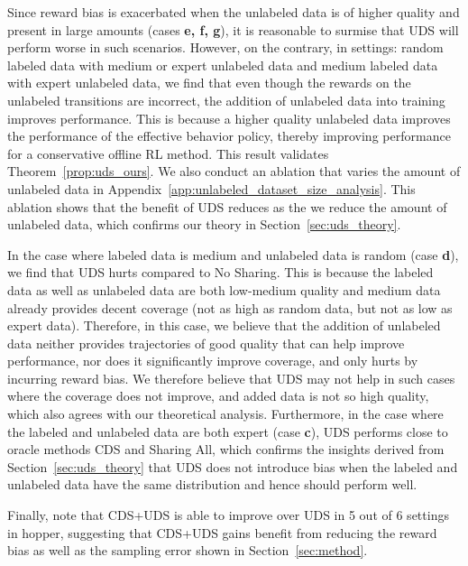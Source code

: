 Since reward bias is exacerbated when the unlabeled data is of higher quality and present in large amounts (cases \textbf{e, f, g}), it is reasonable to surmise that UDS will perform worse in such scenarios. However, on the contrary, in settings: random labeled data with medium or expert unlabeled data and medium labeled data with expert unlabeled data, we find that even though the rewards on the unlabeled transitions are incorrect, the addition of unlabeled data into training improves performance. This is because a higher quality unlabeled data improves the performance of the effective behavior policy, thereby improving performance for a conservative offline RL method. This result validates Theorem~\ref{prop:uds_ours}. 
We also conduct an ablation that varies the amount of unlabeled data in Appendix~\ref{app:unlabeled_dataset_size_analysis}. This ablation shows that the benefit of UDS reduces as the we reduce the amount of unlabeled data, which confirms our theory in Section~\ref{sec:uds_theory}.

In the case where labeled data is medium and unlabeled data is random (case \textbf{d}), we find that UDS hurts compared to No Sharing. This is because the labeled data as well as unlabeled data are both low-medium quality and medium data already provides decent coverage (not as high as random data, but not as low as expert data). Therefore, in this case, we believe that the addition of unlabeled data neither provides trajectories of good quality that can help improve performance, nor does it significantly improve coverage, and only hurts by incurring reward bias. We therefore believe that UDS may not help in such cases where the coverage does not improve, and added data is not so high quality, which also agrees with our theoretical analysis. Furthermore, in the case where the labeled and unlabeled data are both expert (case \textbf{c}), UDS performs close to oracle methods CDS and Sharing All, which confirms the insights derived from Section~\ref{sec:uds_theory} that UDS does not introduce bias when the labeled and unlabeled data have the same distribution and hence should perform well.

Finally, note that CDS+UDS is able to improve over UDS in 5 out of 6 settings in hopper, suggesting that CDS+UDS gains benefit from reducing the reward bias as well as the sampling error shown in Section~\ref{sec:method}.




